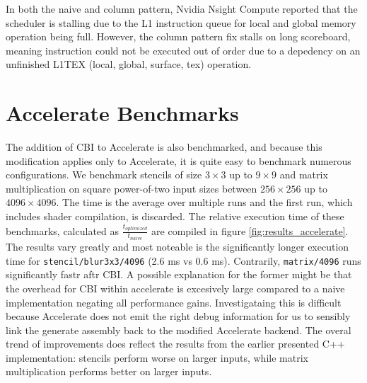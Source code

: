 In both the naive and column pattern, Nvidia Nsight Compute reported that the scheduler is stalling due to the L1 instruction queue for local and global memory operation being full.
However, the column pattern fix stalls on long scoreboard, meaning instruction could not be executed out of order due to a depedency on an unfinished L1TEX (local, global, surface, tex) operation.

\section{Accelerate Benchmarks}
\label{sec:accelerate_benchmark}
The addition of CBI to Accelerate is also benchmarked, and because this modification applies only to Accelerate, it is quite easy to benchmark numerous configurations.
We benchmark stencils of size $3\times 3$ up to $9\times 9$ and matrix multiplication on square power-of-two input sizes between $256\times 256$ up to $4096\times 4096$.
The time is the average over multiple runs and the first run, which includes shader compilation, is discarded.
The relative execution time of these benchmarks, calculated as $\frac{t_{optimized}}{t_{naive}}$ are compiled in figure \ref{fig:results_accelerate}.
The results vary greatly and most noteable is the significantly longer execution time for \texttt{stencil/blur3x3/4096} (2.6 ms vs 0.6 ms). Contrarily, \texttt{matrix/4096} runs significantly fastr aftr CBI.
A possible explanation for the former might be that the overhead for CBI within accelerate is excesively large compared to a naive implementation negating all performance gains.
Investigataing this is difficult because Accelerate does not emit the right debug information for us to sensibly link the generate assembly back to the modified Accelerate backend.
The overal trend of improvements does reflect the results from the earlier presented C++ implementation: stencils perform worse on larger inputs, while matrix multiplication performs better on larger inputs.

